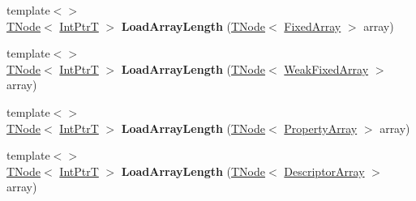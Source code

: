 \begin{DoxyCompactItemize}
\item 
\mbox{\label{classv8_1_1internal_1_1CodeStubAssembler_a4f9cffbd5b4c3374cadd0aa1e337c434}} 
{\footnotesize template$<$$>$ }\\\mbox{\hyperlink{classv8_1_1internal_1_1compiler_1_1TNode}{T\+Node}}$<$ \mbox{\hyperlink{structv8_1_1internal_1_1IntPtrT}{Int\+PtrT}} $>$ {\bfseries Load\+Array\+Length} (\mbox{\hyperlink{classv8_1_1internal_1_1compiler_1_1TNode}{T\+Node}}$<$ \mbox{\hyperlink{classv8_1_1internal_1_1FixedArray}{Fixed\+Array}} $>$ array)
\item 
\mbox{\label{classv8_1_1internal_1_1CodeStubAssembler_a7f04b91619d36a6dd259ab7b76384a15}} 
{\footnotesize template$<$$>$ }\\\mbox{\hyperlink{classv8_1_1internal_1_1compiler_1_1TNode}{T\+Node}}$<$ \mbox{\hyperlink{structv8_1_1internal_1_1IntPtrT}{Int\+PtrT}} $>$ {\bfseries Load\+Array\+Length} (\mbox{\hyperlink{classv8_1_1internal_1_1compiler_1_1TNode}{T\+Node}}$<$ \mbox{\hyperlink{classv8_1_1internal_1_1WeakFixedArray}{Weak\+Fixed\+Array}} $>$ array)
\item 
\mbox{\label{classv8_1_1internal_1_1CodeStubAssembler_ac44c0f3094a4b5a8a95ee0d3dcd7bef1}} 
{\footnotesize template$<$$>$ }\\\mbox{\hyperlink{classv8_1_1internal_1_1compiler_1_1TNode}{T\+Node}}$<$ \mbox{\hyperlink{structv8_1_1internal_1_1IntPtrT}{Int\+PtrT}} $>$ {\bfseries Load\+Array\+Length} (\mbox{\hyperlink{classv8_1_1internal_1_1compiler_1_1TNode}{T\+Node}}$<$ \mbox{\hyperlink{classv8_1_1internal_1_1PropertyArray}{Property\+Array}} $>$ array)
\item 
\mbox{\label{classv8_1_1internal_1_1CodeStubAssembler_addbb8cfb584213be09aeaa90c844bb32}} 
{\footnotesize template$<$$>$ }\\\mbox{\hyperlink{classv8_1_1internal_1_1compiler_1_1TNode}{T\+Node}}$<$ \mbox{\hyperlink{structv8_1_1internal_1_1IntPtrT}{Int\+PtrT}} $>$ {\bfseries Load\+Array\+Length} (\mbox{\hyperlink{classv8_1_1internal_1_1compiler_1_1TNode}{T\+Node}}$<$ \mbox{\hyperlink{classv8_1_1internal_1_1DescriptorArray}{Descriptor\+Array}} $>$ array)
\item 
\mbox{\label{classv8_1_1internal_1_1CodeStubAssembler_aa0674f968385c66c65bfb866b5fefef4}} 

\end{DoxyCompactItemize}
